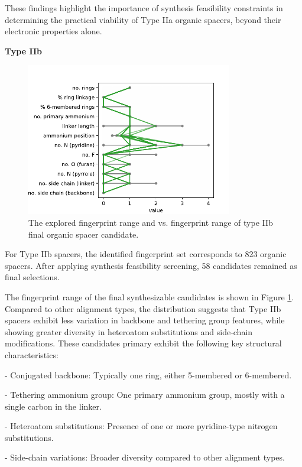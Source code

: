 These findings highlight the importance of synthesis feasibility constraints in determining the practical viability of Type IIa organic spacers, beyond their electronic properties alone.

\textbf{Type IIb}

\begin{figure}[htbp]
    \centering
    \includegraphics[width=0.8\textwidth]{figures/synthesis-feasibility/figure5-18.pdf}
    \caption{The explored fingerprint range and vs. fingerprint range of type IIb final organic spacer candidate.}
    \label{fig:figure5.18}
\end{figure}

For Type IIb spacers, the identified fingerprint set corresponds to 823 organic spacers. After applying synthesis feasibility screening, 58 candidates remained as final selections.

The fingerprint range of the final synthesizable candidates is shown in Figure \ref{fig:figure5.18}. Compared to other alignment types, the distribution suggests that Type IIb spacers exhibit less variation in backbone and tethering group features, while showing greater diversity in heteroatom substitutions and side-chain modifications. These candidates primary exhibit the following key structural characteristics:

-	Conjugated backbone: Typically one ring, either 5-membered or 6-membered.

-	Tethering ammonium group: One primary ammonium group, mostly with a single carbon in the linker.

-	Heteroatom substitutions: Presence of one or more pyridine-type nitrogen substitutions.

-	Side-chain variations: Broader diversity compared to other alignment types.

